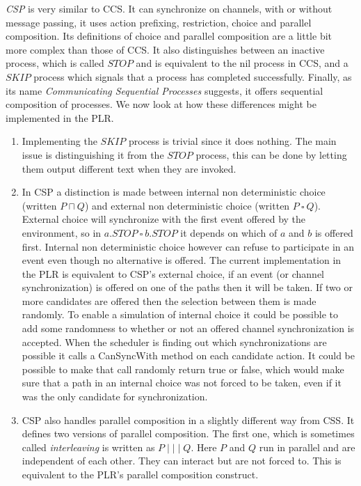	\textit{CSP} is very similar to CCS. It can synchronize on channels, with or 
	without message passing, it uses action prefixing, restriction, choice and 
	parallel composition. Its definitions of choice and parallel composition are 
	a little bit more complex than those of CCS. It also distinguishes between 
	an inactive process, which is called $STOP$ and is equivalent to the nil 
	process in CCS, and a $SKIP$ process which signals that a process has 
	completed successfully. Finally, as its name \textit{Communicating 
	Sequential Processes} suggests, it offers sequential composition of 
	processes. We now look at how these differences might be implemented in the 
	PLR.
	
	\begin{enumerate}
		\item Implementing the $SKIP$ process is trivial since it does nothing. 
		The main issue is distinguishing it from the $STOP$ process, this can be 
		done by letting them output different text when they are invoked.
		
		\item In CSP a distinction is made between internal non deterministic 
		choice (written $P \sqcap Q$) and external non deterministic choice 
		(written $P\ \square\ Q$). External choice will synchronize with the first 
		event offered by  the environment, so in $a . STOP\ \square\ b . STOP$ it 
		depends on which of $a$ and $b$ is offered first. Internal non 
		deterministic choice however can refuse to participate in an event even 
		though no alternative is offered. The current implementation in the PLR is 
		equivalent to CSP's external choice, if an event (or channel 
		synchronization) is offered on one of the paths then it will be taken. If 
		two or more candidates are offered then the selection between them is made 
		randomly. To enable a simulation of internal choice it could be possible 
		to add some randomness to whether or not an offered channel 
		synchronization is accepted. When the scheduler is finding out which 
		synchronizations are possible it calls a \textsf{CanSyncWith} method on 
		each candidate action. It could be possible to make that call randomly 
		return true or false, which would make sure that a path in an internal 
		choice was not forced to be taken, even if it was the only candidate for 
		synchronization.
		
		\item CSP also handles parallel composition in a slightly different way 
		from CSS. It defines two versions of parallel composition. The first one, 
		which is sometimes called \textit{interleaving} is written as $P 
		\mid\mid\mid Q$. Here $P$ and $Q$ run in parallel and are independent of 
		each other. They can interact but are not forced to. This is equivalent to 
		the PLR's parallel composition construct. 
		

\end{enumerate}
